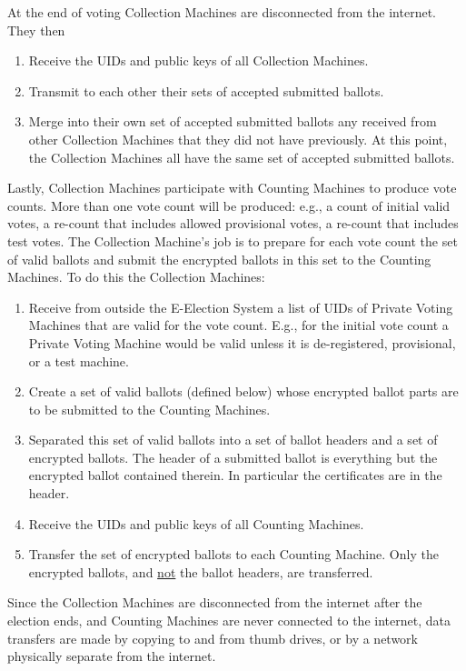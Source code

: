 \documentclass[12pt]{article}
\begin{document}
At the end of voting Collection Machines are disconnected from
the internet.  They then
\begin{enumerate}
\item Receive the UIDs and public keys of all Collection Machines.
\item Transmit to each other their sets of accepted submitted ballots.
\item Merge into their own set of accepted submitted ballots any
received from other Collection Machines that they did not have previously.
At this point, the Collection Machines all have the same set of accepted
submitted ballots.
\setcounter{CMC-COUNTER}{\value{enumi}}
\end{enumerate}

Lastly, Collection Machines participate with Counting Machines to
produce vote counts.  More than one vote count will be produced:
e.g., a count of initial valid votes, a re-count that includes
allowed provisional votes, a re-count that includes test votes.
The Collection Machine's job is to prepare for each vote count
the set of valid ballots and submit the encrypted ballots in
this set to the Counting Machines.
To do this the Collection Machines:

\begin{enumerate}
\setcounter{enumi}{\value{CMC-COUNTER}}
\item Receive from outside the E-Election System a list of UIDs of
Private Voting Machines that are valid for the vote count.
E.g., for the initial vote count a Private Voting Machine would
be valid unless it is de-registered, provisional, or a test machine.
\item Create a set of valid ballots (defined below)
whose encrypted ballot parts are to be submitted to the Counting Machines.
\item Separated this set of valid ballots into a set of ballot headers
and a set of encrypted ballots.  The header of a submitted ballot is
everything but the encrypted ballot contained therein.  In particular
the certificates are in the header.
\item Receive the UIDs and public keys of all Counting Machines.
\item Transfer the set of encrypted ballots to each Counting Machine.
Only the encrypted ballots, and \underline{not} the ballot headers,
are transferred.
\end{enumerate}

Since the Collection Machines are disconnected from the internet
after the election ends, and Counting Machines
are never connected to the internet,
data transfers are made by copying to and from thumb drives, or by
a network physically separate from the internet.
\end{document}
